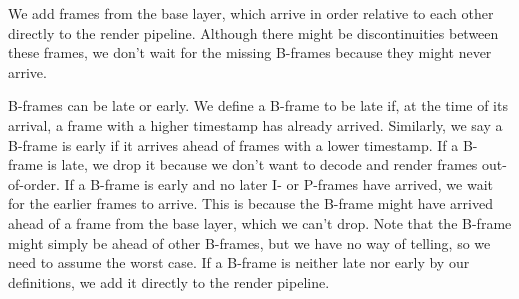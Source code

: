 We add frames from the base layer, which arrive in order relative to each other directly to the render pipeline. Although there might be discontinuities between these frames, we don't wait for the missing B-frames because they might never arrive.

B-frames can be late or early. We define a B-frame to be late if, at the time of its arrival, a frame with a higher timestamp has already arrived. Similarly, we say a B-frame is early if it arrives ahead of frames with a lower timestamp. If a B-frame is late, we drop it because we don't want to decode and render frames out-of-order. If a B-frame is early and no later I- or P-frames have arrived, we wait for the earlier frames to arrive. This is because the B-frame might have arrived ahead of a frame from the base layer, which we can't drop. Note that the B-frame might simply be ahead of other B-frames, but we have no way of telling, so we need to assume the worst case. If a B-frame is neither late nor early by our definitions, we add it directly to the render pipeline. 

